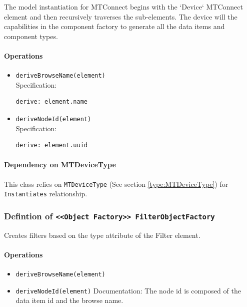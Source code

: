 The model instantiation for MTConnect begins with the `Device` MTConnect element and then recursively traverses the sub-elements. The device will the capabilities in the component factory to generate all the data items and component types. 

\paragraph{Operations}
\begin{itemize}
  \item \texttt{deriveBrowseName(element)}\\
    Specification:
   \indent \begin{Verbatim}[xleftmargin=.25in,fontsize=\small]
derive: element.name
\end{Verbatim}

  \item \texttt{deriveNodeId(element)}\\
    Specification:
   \indent \begin{Verbatim}[xleftmargin=.25in,fontsize=\small]
derive: element.uuid
\end{Verbatim}

\end{itemize}
\paragraph{Dependency on MTDeviceType}

This class relies on \texttt{MTDeviceType} (See section \ref{type:MTDeviceType}) for \texttt{Instantiates} relationship.

\FloatBarrier
\subsubsection{Defintion of \texttt{<<Object Factory>> FilterObjectFactory}} \label{type:FilterObjectFactory}

\FloatBarrier

Creates filters based on the type attribute of the Filter element. 

\paragraph{Operations}
\begin{itemize}
  \item \texttt{deriveBrowseName(element)}
  \item \texttt{deriveNodeId(element)}
    Documentation: The node id is composed of the data item id and the browse name.

\end{itemize}
